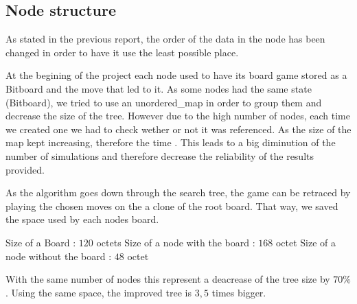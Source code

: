 \subsection{Node structure}

As stated in the previous report, the order of the data in the node has been changed in order to have it use the least possible place.

At the begining of the project each node used to have its board game stored as a Bitboard and the move that led to it. As some nodes had the same state (Bitboard), we tried to use an unordered\_map in order to group them and decrease the size of the tree. However due to the high number of nodes, each time we created one we had to check wether or not it was referenced. As the size of the map kept increasing, therefore the time . This leads to a big diminution of the number of simulations and therefore decrease the reliability of the results provided.

As the algorithm goes down through the search tree, the game can be retraced by playing the chosen moves on the a clone of the root board. That way, we saved the space used by each nodes board.

Size of a Board : $120$ octets
Size of a node with the board : $168$ octet
Size of a node without the board : $48$ octet

With the same number of nodes this represent a deacrease of the tree size by $70\%$.
Using the same space, the improved tree is $3,5$ times bigger.